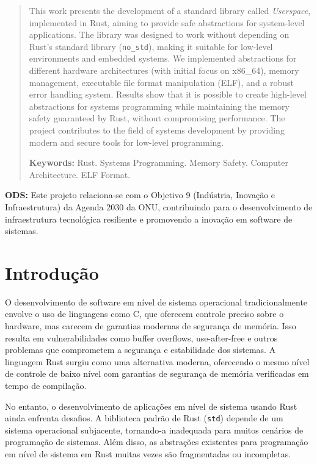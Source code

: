 \documentclass[12pt,a4paper]{article}
\begin{document}
\begin{abstract}
This work presents the development of a standard library called \textit{Userspace}, implemented in Rust, aiming to provide safe abstractions for system-level applications. The library was designed to work without depending on Rust's standard library (\texttt{no\_std}), making it suitable for low-level environments and embedded systems. We implemented abstractions for different hardware architectures (with initial focus on x86\_64), memory management, executable file format manipulation (ELF), and a robust error handling system. Results show that it is possible to create high-level abstractions for systems programming while maintaining the memory safety guaranteed by Rust, without compromising performance. The project contributes to the field of systems development by providing modern and secure tools for low-level programming.

\vspace{0.5cm}
\noindent\textbf{Keywords:} Rust. Systems Programming. Memory Safety. Computer Architecture. ELF Format.
\end{abstract}

\vspace{0.5cm}

\noindent\textbf{ODS:} Este projeto relaciona-se com o Objetivo 9 (Indústria, Inovação e Infraestrutura) da Agenda 2030 da ONU, contribuindo para o desenvolvimento de infraestrutura tecnológica resiliente e promovendo a inovação em software de sistemas.

\newpage

\section{Introdução}

O desenvolvimento de software em nível de sistema operacional tradicionalmente envolve o uso de linguagens como C, que oferecem controle preciso sobre o hardware, mas carecem de garantias modernas de segurança de memória. Isso resulta em vulnerabilidades como buffer overflows, use-after-free e outros problemas que comprometem a segurança e estabilidade dos sistemas. A linguagem Rust surgiu como uma alternativa moderna, oferecendo o mesmo nível de controle de baixo nível com garantias de segurança de memória verificadas em tempo de compilação.

No entanto, o desenvolvimento de aplicações em nível de sistema usando Rust ainda enfrenta desafios. A biblioteca padrão de Rust (\texttt{std}) depende de um sistema operacional subjacente, tornando-a inadequada para muitos cenários de programação de sistemas. Além disso, as abstrações existentes para programação em nível de sistema em Rust muitas vezes são fragmentadas ou incompletas.
\end{document}
